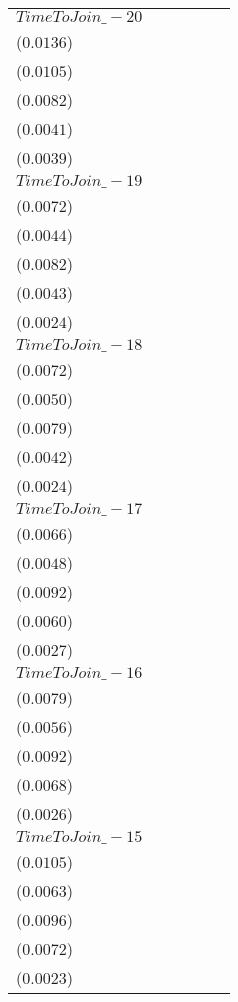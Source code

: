\begin{tabular}{llllll}
$TimeToJoin\_-20$ &     \makecell{$0.0061^{}$ \\ ($0.0136$)} &     \makecell{$0.0037^{}$ \\ ($0.0105$)} &   \makecell{$-0.0169^{**}$ \\ ($0.0082$)} &   \makecell{$-0.0097^{**}$ \\ ($0.0041$)} &     \makecell{$0.0049^{}$ \\ ($0.0039$)} \\
$TimeToJoin\_-19$ &    \makecell{$-0.0051^{}$ \\ ($0.0072$)} &    \makecell{$-0.0049^{}$ \\ ($0.0044$)} &   \makecell{$-0.0171^{**}$ \\ ($0.0082$)} &   \makecell{$-0.0089^{**}$ \\ ($0.0043$)} &     \makecell{$0.0030^{}$ \\ ($0.0024$)} \\
$TimeToJoin\_-18$ &    \makecell{$-0.0082^{}$ \\ ($0.0072$)} &    \makecell{$-0.0081^{}$ \\ ($0.0050$)} &   \makecell{$-0.0177^{**}$ \\ ($0.0079$)} &   \makecell{$-0.0105^{**}$ \\ ($0.0042$)} &     \makecell{$0.0027^{}$ \\ ($0.0024$)} \\
$TimeToJoin\_-17$ &     \makecell{$0.0006^{}$ \\ ($0.0066$)} &    \makecell{$-0.0019^{}$ \\ ($0.0048$)} &    \makecell{$-0.0158^{*}$ \\ ($0.0092$)} &     \makecell{$-0.0075^{}$ \\ ($0.0060$)} &     \makecell{$0.0042^{}$ \\ ($0.0027$)} \\
$TimeToJoin\_-16$ &     \makecell{$0.0035^{}$ \\ ($0.0079$)} &    \makecell{$-0.0008^{}$ \\ ($0.0056$)} &    \makecell{$-0.0167^{*}$ \\ ($0.0092$)} &     \makecell{$-0.0073^{}$ \\ ($0.0068$)} &     \makecell{$0.0039^{}$ \\ ($0.0026$)} \\
$TimeToJoin\_-15$ &     \makecell{$0.0101^{}$ \\ ($0.0105$)} &     \makecell{$0.0033^{}$ \\ ($0.0063$)} &     \makecell{$-0.0147^{}$ \\ ($0.0096$)} &     \makecell{$-0.0031^{}$ \\ ($0.0072$)} &   \makecell{$0.0057^{**}$ \\ ($0.0023$)} \\

\end{tabular}
